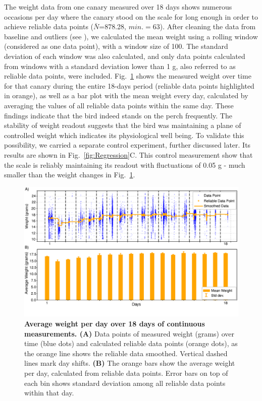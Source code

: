 \documentclass{article}
\begin{document}
The weight data from one canary measured over 18 days shows numerous occasions per day where the canary stood on the scale for long enough in order to achieve reliable data points (\( \bar{N} \)=878.28, $ min.=63$). After cleaning the data from baseline and outliers (see ), we calculated the mean weight using a rolling window (considered as one data point), with a window size of 100. The standard deviation of each window was also calculated, and only data points calculated from windows with a standard deviation lower than 1 g, also referred to as reliable data points, were included. Fig.~\ref{fig:weight-18days} shows the measured weight over time for that canary during the entire 18-days period (reliable data points highlighted in orange), as well as a bar plot with the mean weight every day, calculated by averaging the values of all reliable data points within the same day. These findings indicate that the bird indeed stands on the perch frequently. The stability of weight readout suggests that the bird was maintaining a plane of controlled weight which indicates its physiological well being. To validate this possibility, we carried a separate control experiment, further discussed later. Its results are shown in Fig.~\ref{fig:Regression}C. This control measurement show that the scale is reliably maintaining its readout with fluctuations of 0.05 g - much smaller than the weight changes in Fig.~\ref{fig:weight-18days}.  %

\begin{figure}
    \centering
    \includegraphics[width=1\linewidth]{Figures/Average_Weight_per_day.png}
    \caption{\textbf{Average weight per day over 18 days of continuous measurements. (A)} Data points of measured weight (grams) over time (blue dots) and calculated reliable data points (orange dots), as the orange line shows the reliable data smoothed. Vertical dashed lines mark day shifts. \textbf{(B)} The orange bars show the average weight per day, calculated from reliable data points. Error bars on top of each bin shows standard deviation among all reliable data points within that day.}
    \label{fig:weight-18days}
\end{figure}
\end{document}
